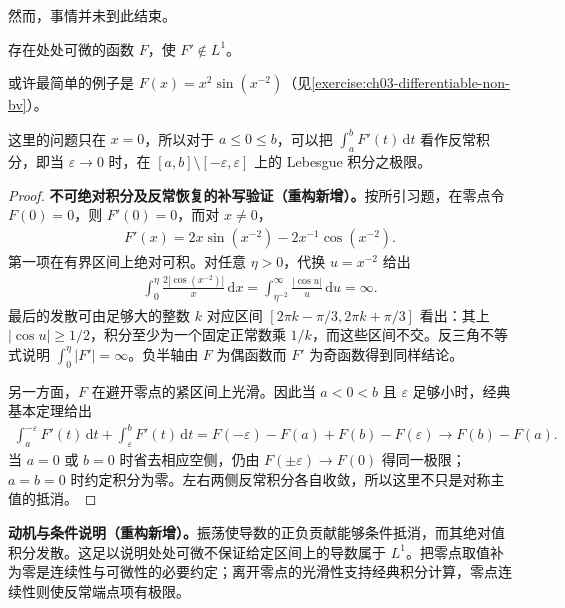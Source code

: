 \documentclass[../../main.tex]{subfiles}%
\begin{document}
然而，事情并未到此结束。
\begin{proposition}\label{proposition:ch03-nonintegrable-derivative-existence}
存在处处可微的函数 $F$，使 $F'\notin L^1$。
\end{proposition}
\begin{example}\label{example:ch03-nonintegrable-derivative}
或许最简单的例子是 $F(x)=x^2\sin(x^{-2})$（见\cref{exercise:ch03-differentiable-non-bv}）。
\end{example}
这里的问题只在 $x=0$，所以对于 $a\le0\le b$，可以把 $\int_a^bF'(t)\,\mathrm dt$ 看作反常积分，即当 $\varepsilon\to0$ 时，在 $[a,b]\setminus[-\varepsilon,\varepsilon]$ 上的 Lebesgue 积分之极限。
\begin{proof}
\textbf{不可绝对积分及反常恢复的补写验证（重构新增）。}按所引习题，在零点令 $F(0)=0$，则 $F'(0)=0$，而对 $x\ne0$，
\begin{align*}
F'(x)=2x\sin(x^{-2})-2x^{-1}\cos(x^{-2}).
\end{align*}
第一项在有界区间上绝对可积。对任意 $\eta>0$，代换 $u=x^{-2}$ 给出
\begin{align*}
\int_0^\eta \frac{2|\cos(x^{-2})|}{x}\,\mathrm dx
=\int_{\eta^{-2}}^\infty\frac{|\cos u|}{u}\,\mathrm du=\infty.
\end{align*}
最后的发散可由足够大的整数 $k$ 对应区间 $[2\pi k-\pi/3,2\pi k+\pi/3]$ 看出：其上 $|\cos u|\ge1/2$，积分至少为一个固定正常数乘 $1/k$，而这些区间不交。反三角不等式说明 $\int_0^\eta|F'|=\infty$。负半轴由 $F$ 为偶函数而 $F'$ 为奇函数得到同样结论。

另一方面，$F$ 在避开零点的紧区间上光滑。因此当 $a<0<b$ 且 $\varepsilon$ 足够小时，经典基本定理给出
\begin{align*}
\int_a^{-\varepsilon}F'(t)\,\mathrm dt+\int_\varepsilon^bF'(t)\,\mathrm dt
=F(-\varepsilon)-F(a)+F(b)-F(\varepsilon)
\longrightarrow F(b)-F(a).
\end{align*}
当 $a=0$ 或 $b=0$ 时省去相应空侧，仍由 $F(\pm\varepsilon)\to F(0)$ 得同一极限；$a=b=0$ 时约定积分为零。左右两侧反常积分各自收敛，所以这里不只是对称主值的抵消。
\end{proof}
\begin{remark}
\textbf{动机与条件说明（重构新增）。}振荡使导数的正负贡献能够条件抵消，而其绝对值积分发散。这足以说明处处可微不保证给定区间上的导数属于 $L^1$。把零点取值补为零是连续性与可微性的必要约定；离开零点的光滑性支持经典积分计算，零点连续性则使反常端点项有极限。
\end{remark}
\end{document}

